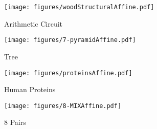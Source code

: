 \begin{figure*}
\centering
\caption{Test log-likelihood as a function of $\ell_1$-penalization for affine normalizers. The red horizontal line is the average result when given a prescribed topology, the green horizontal line is the result with an autoregressive conditioner.}
    \label{fig:all_L1}
    \begin{subfigure}[t]{.24\textwidth}
    \texttt{[image: figures/woodStructuralAffine.pdf]}
    \caption{Arithmetic Circuit}
    \end{subfigure}
    \begin{subfigure}[t]{.24\textwidth}
    \texttt{[image: figures/7-pyramidAffine.pdf]}
    \caption{Tree}
    \end{subfigure}
    \begin{subfigure}[t]{.24\textwidth}
    \texttt{[image: figures/proteinsAffine.pdf]}
    \caption{Human Proteins}
    \end{subfigure}
    \begin{subfigure}[t]{.24\textwidth}
    \texttt{[image: figures/8-MIXAffine.pdf]}
    \caption{8 Pairs}
    \end{subfigure}
    \label{fig:app_aff_L1}
\end{figure*}

